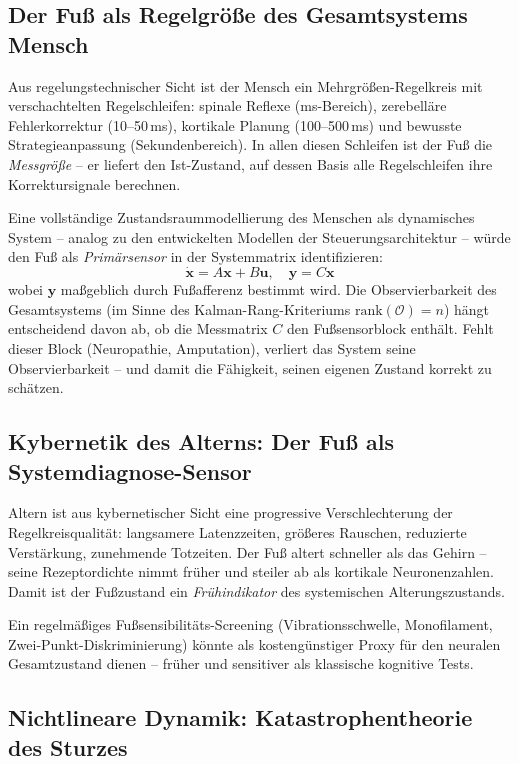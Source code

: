 ﻿\documentclass[12pt,a4paper]{report}
\theoremstyle{plain}
\theoremstyle{definition}
\theoremstyle{remark}
\begin{document}
\subsection{Der Fuß als Regelgröße des Gesamtsystems Mensch}

Aus regelungstechnischer Sicht ist der Mensch ein
Mehrgrößen-Regelkreis mit verschachtelten Regelschleifen:
spinale Reflexe (ms-Bereich), zerebelläre Fehlerkorrektur
(10--50\,ms), kortikale Planung (100--500\,ms) und
bewusste Strategieanpassung (Sekundenbereich). In allen diesen
Schleifen ist der Fuß die \emph{Messgröße} -- er liefert den
Ist-Zustand, auf dessen Basis alle Regelschleifen ihre
Korrektursignale berechnen.

Eine vollständige Zustandsraummodellierung des Menschen als
dynamisches System -- analog zu den entwickelten Modellen der Steuerungsarchitektur -- würde den
Fuß als \emph{Primärsensor} in der Systemmatrix identifizieren:
\[
  \dot{\mathbf{x}} = A\mathbf{x} + B\mathbf{u}, \quad \mathbf{y} = C\mathbf{x}
\]
wobei $\mathbf{y}$ maßgeblich durch Fußafferenz bestimmt wird.
Die Observierbarkeit des Gesamtsystems (im Sinne des
Kalman-Rang-Kriteriums $\text{rank}(\mathcal{O}) = n$) hängt
entscheidend davon ab, ob die Messmatrix $C$ den Fußsensorblock
enthält. Fehlt dieser Block (Neuropathie, Amputation), verliert
das System seine Observierbarkeit -- und damit die Fähigkeit,
seinen eigenen Zustand korrekt zu schätzen.

\subsection{Kybernetik des Alterns: Der Fuß als Systemdiagnose-Sensor}

Altern ist aus kybernetischer Sicht eine progressive
Verschlechterung der Regelkreisqualität: langsamere Latenzzeiten,
größeres Rauschen, reduzierte Verstärkung, zunehmende
Totzeiten. Der Fuß altert schneller als das Gehirn -- seine
Rezeptordichte nimmt früher und steiler ab als kortikale
Neuronenzahlen. Damit ist der Fußzustand ein
\emph{Frühindikator} des systemischen Alterungszustands.

Ein regelmäßiges Fußsensibilitäts-Screening (Vibrationsschwelle,
Monofilament, Zwei-Punkt-Diskriminierung) könnte als kostengünstiger
Proxy für den neuralen Gesamtzustand dienen -- früher und
sensitiver als klassische kognitive Tests.

\subsection{Nichtlineare Dynamik: Katastrophentheorie des Sturzes}
\end{document}
